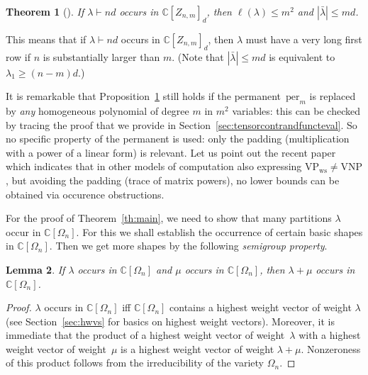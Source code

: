 \documentclass[11pt]{amsart}
\def\C{\mathbb{C}}
\def\per{\mathrm{per}}
\def\VNP{\mathrm{VNP}}
\def\VPs{\mathrm{VP}_{\mathrm{ws}}}
\newcommand{\Det}{\Omega}
\def\la{\lambda}
\newcommand{\IC}{\ensuremath{\mathbb{C}}}
\numberwithin{equation}{section}
\newtheorem{theorem}{Theorem}[section]
\newtheorem{lemma}[theorem]{Lemma}
\begin{document}
\begin{theorem}[\cite{kadish-landsberg:14}]\label{pro:I-KaLa}
If $\la\vdash nd$ occurs in $\IC[Z_{n,m}]_d$, then $\ell(\la)\leq m^2$ and $|\bar\la|\leq md$. 
\end{theorem}

This means that if $\la\vdash nd$ occurs in $\IC[Z_{n,m}]_d$, then $\la$ must have a very long first row
if $n$ is substantially larger than $m$. 
(Note that $|\bar\la|\leq md$ is equivalent to $\la_1\ge (n-m)d$.)

It is remarkable that Proposition~\ref{pro:I-KaLa} still holds if the permanent~$\per_m$ is replaced by 
{\em any} homogeneous polynomial of degree $m$ in $m^2$ variables: 
this can be checked by tracing the proof 
that we provide in Section~\ref{sec:tensorcontrandfuncteval}. 
So no specific property of the permanent is used: only the padding 
(multiplication with a power of a linear form) is relevant. 
Let us point out the recent paper~\cite{GIP:17} which indicates that in other models of computation 
also expressing $\VPs\ne\VNP$, but avoiding the padding (trace of matrix powers), 
no lower bounds can be obtained via occurence obstructions.

For the proof of Theorem~\ref{th:main}, we need to show that many partitions $\la$ occur in $\C[\Det_n]$. 
For this we shall establish the occurrence of certain basic shapes in $\C[\Det_n]$. 
Then we get more shapes by the following \emph{semigroup property}.%

\begin{lemma}\label{le:SGP}
If $\la$ occurs in $\C[\Det_n]$ and $\mu$ occurs in $\C[\Det_n]$,
then $\la+\mu$ occurs in $\C[\Det_n]$.
\end{lemma}

\begin{proof}
$\la$ occurs in $\C[\Det_n]$ iff $\C[\Det_n]$ contains a highest weight vector 
of weight $\la$ (see Section~\ref{sec:hwvs} for basics on highest weight vectors). 
Moreover, it is immediate that the product of a highest weight vector of weight~$\la$ 
with a highest weight vector of weight~$\mu$ is a  highest weight vector of weight $\la+\mu$.
Nonzeroness of this product follows from the irreducibility of the variety $\Det_n$.
\end{proof}

\end{document}
